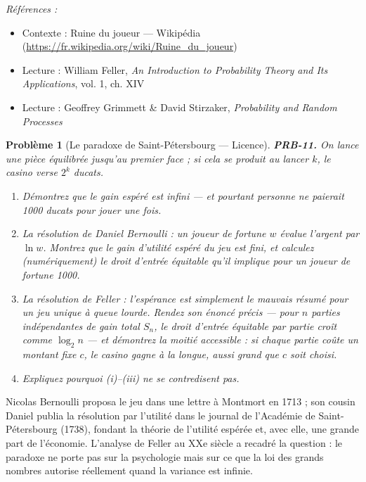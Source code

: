 \documentclass[11pt]{article}
\newtheorem{problem}{Problème}
\newenvironment{refs}{\par\small\noindent\emph{Références :}\begin{itemize}\setlength\itemsep{0pt}}{\end{itemize}\normalsize}
\begin{document}
\begin{refs}
\item Contexte : Ruine du joueur --- Wikipédia (\url{https://fr.wikipedia.org/wiki/Ruine_du_joueur})
\item Lecture : William Feller, \textit{An Introduction to Probability Theory and Its Applications}, vol. 1, ch. XIV
\item Lecture : Geoffrey Grimmett \& David Stirzaker, \textit{Probability and Random Processes}
\end{refs}

\bigskip

\begin{problem}[{Le paradoxe de Saint-Pétersbourg --- Licence}]
\textbf{PRB-11.} On lance une pièce équilibrée jusqu'au premier \og{} face \fg{} ;
si cela se produit au lancer $ k $, le casino verse $ 2^k $ ducats.
\begin{enumerate}
\item[(i)] Démontrez que le gain espéré est infini --- et pourtant personne ne paierait 1000 ducats pour
jouer une fois.
\item[(ii)] La résolution de Daniel Bernoulli : un joueur de fortune $ w $ évalue l'argent par
$ \ln w $. Montrez que le \textit{gain d'utilité} espéré du jeu est fini, et calculez
(numériquement) le droit d'entrée équitable qu'il implique pour un joueur de fortune 1000.
\item[(iii)] La résolution de Feller : l'espérance est simplement le mauvais résumé pour un jeu unique à
queue lourde. Rendez son énoncé précis --- pour $ n $ parties indépendantes de gain total
$ S_n $, le droit d'entrée \og{} équitable \fg{} par partie croît comme $ \log_2 n $ --- et démontrez la
moitié accessible : si chaque partie coûte un montant fixe $ c $, le casino gagne à la longue,
aussi grand que $ c $ soit choisi.
\item[(iv)] Expliquez pourquoi (i)--(iii) ne se contredisent pas.
\end{enumerate}

\end{problem}

\noindent Nicolas Bernoulli proposa le jeu dans une lettre à Montmort en 1713 ; son cousin
Daniel publia la résolution par l'utilité dans le journal de l'Académie de Saint-Pétersbourg
(1738), fondant la théorie de l'utilité espérée et, avec elle, une grande part de l'économie.
L'analyse de Feller au XXe siècle a recadré la question : le paradoxe ne porte pas sur
la psychologie mais sur ce que la loi des grands nombres autorise réellement quand la variance est
infinie.
\end{document}
